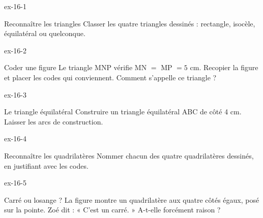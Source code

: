 \clearpage{}
\begin{blocLivre}{ex-16-1}\begin{exercice}[1]{Reconnaître les triangles}
Classer les quatre triangles dessinés : rectangle, isocèle, équilatéral ou quelconque.
\label{fig-ex-16-1}
\end{exercice}\end{blocLivre}
\begin{blocLivre}{ex-16-2}\begin{exercice}[1]{Coder une figure}
Le triangle MNP vérifie MN $=$ MP $=5$ cm. Recopier la figure et placer les codes qui conviennent. Comment s’appelle ce triangle ?
\label{fig-ex-16-2}
\end{exercice}\end{blocLivre}
\begin{blocLivre}{ex-16-3}\begin{exercice}[1]{Le triangle équilatéral}
Construire un triangle équilatéral ABC de côté 4 cm. Laisser les arcs de construction.
\label{fig-ex-16-3}
\end{exercice}\end{blocLivre}
\begin{blocLivre}{ex-16-4}\begin{exercice}[1]{Reconnaître les quadrilatères}
Nommer chacun des quatre quadrilatères dessinés, en justifiant avec les codes.
\label{fig-ex-16-4}
\end{exercice}\end{blocLivre}
\begin{blocLivre}{ex-16-5}\begin{exercice}[1]{Carré ou losange ?}
La figure montre un quadrilatère aux quatre côtés égaux, posé sur la pointe. Zoé dit : « C’est un carré. » A-t-elle forcément raison ?
\label{fig-ex-16-5}
\end{exercice}\end{blocLivre}

